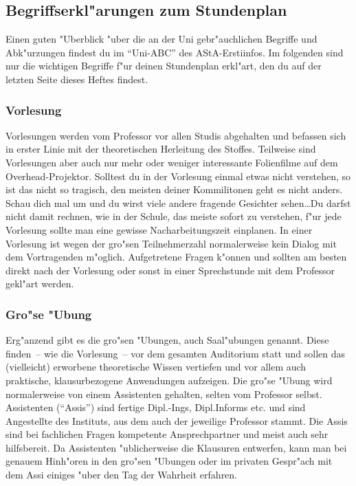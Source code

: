 \subsection{Begriffserkl"arungen zum Stundenplan}


Einen guten "Uberblick "uber die an der Uni gebr"auchlichen Begriffe und
Abk"urzungen findest du im "`Uni-ABC"' des AStA-Erstiinfos. Im folgenden
sind nur die wichtigen Begriffe f"ur deinen Stundenplan erkl"art, den du
auf der letzten Seite dieses Heftes findest.

\subsubsection*{Vorlesung}

Vorlesungen werden vom Professor vor allen Studis abgehalten und befassen
sich in erster Linie mit der theoretischen Herleitung des Stoffes. Teilweise
sind Vorlesungen aber auch nur mehr oder weniger interessante Folienfilme auf
dem Overhead-Projektor. Solltest du in der Vorlesung einmal etwas nicht
verstehen, so ist das nicht so tragisch, den meisten deiner Kommilitonen geht
es nicht anders. Schau dich mal um und du wirst viele andere fragende Gesichter
sehen\ldots Du darfst nicht damit rechnen, wie in der Schule, das meiste sofort zu
verstehen, f"ur jede Vorlesung sollte man eine gewisse Nacharbeitungszeit
einplanen. In einer Vorlesung ist wegen der gro"sen Teilnehmerzahl
normalerweise kein Dialog mit dem Vortragenden m"oglich. Aufgetretene Fragen
k"onnen und sollten am besten direkt nach der Vorlesung oder sonst in einer
Sprechstunde mit dem Professor gekl"art werden.

\subsubsection*{Gro"se "Ubung}

Erg"anzend gibt es die gro"sen "Ubungen, auch Saal"ubungen genannt. Diese
finden~-- wie die Vorlesung~-- vor dem gesamten Auditorium statt und sollen das
(vielleicht) erworbene theoretische Wissen vertiefen und vor allem auch
praktische, klausurbezogene Anwendungen aufzeigen. Die gro"se "Ubung wird
normalerweise von einem Assistenten gehalten, selten vom Professor selbst.
Assistenten ("`Assis"') sind fertige Dipl.-Ings, Dipl.Informs etc. und sind
Angestellte des Instituts, aus dem auch der jeweilige Professor stammt. Die
Assis sind bei fachlichen Fragen kompetente Ansprechpartner und meist auch sehr
hilfsbereit. Da Assistenten "ublicherweise die Klausuren entwerfen, kann man
bei genauem Hinh"oren in den gro"sen "Ubungen oder im privaten Gespr"ach mit
dem Assi einiges "uber den Tag der Wahrheit erfahren.

